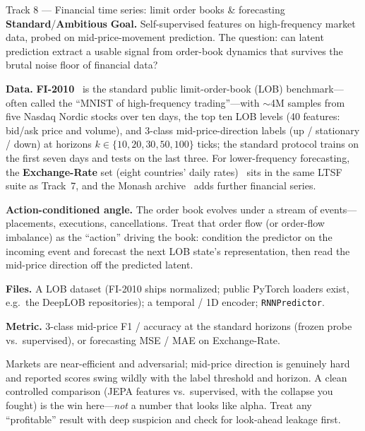 \documentclass{article}
\newcommand{\code}[1]{\texttt{\small #1}}
\newcommand{\diffmed}{\colorbox{ebamber!18}{\textcolor{ebamber}{\small\bfseries Standard}}}
\newcommand{\diffhard}{\colorbox{ebred!15}{\textcolor{ebred}{\small\bfseries Ambitious}}}
\begin{document}
\begin{trackbox}{Track 8 --- Financial time series: limit order books \& forecasting \hfill \diffmed{}/\diffhard{}}
\textbf{Goal.} Self-supervised features on high-frequency market data, probed on
mid-price-movement prediction. The question: can latent prediction extract a usable
signal from order-book dynamics that survives the brutal noise floor of financial
data?

\smallskip
\textbf{Data.} \textbf{FI-2010}~\citep{FI2010} is the standard public limit-order-book
(LOB) benchmark---often called the ``MNIST of high-frequency trading''---with
$\sim$4M samples from five Nasdaq Nordic stocks over ten days, the top ten LOB
levels (40 features: bid/ask price and volume), and 3-class mid-price-direction
labels (up / stationary / down) at horizons $k \in \{10, 20, 30, 50, 100\}$ ticks;
the standard protocol trains on the first seven days and tests on the last three.
For lower-frequency forecasting, the \textbf{Exchange-Rate} set (eight countries'
daily rates)~\citep{LSTNet} sits in the same LTSF suite as Track~7, and the Monash
archive~\citep{MonashTSF} adds further financial series.

\smallskip
\textbf{Action-conditioned angle.} The order book evolves under a stream of
events---placements, executions, cancellations. Treat that order flow (or
order-flow imbalance) as the ``action'' driving the book: condition the predictor
on the incoming event and forecast the next LOB state's representation, then read
the mid-price direction off the predicted latent.

\smallskip
\textbf{Files.} A LOB dataset (FI-2010 ships normalized; public PyTorch loaders
exist, e.g.\ the DeepLOB repositories); a temporal / 1D encoder; \code{RNNPredictor}.

\smallskip
\textbf{Metric.} 3-class mid-price F1 / accuracy at the standard horizons
(frozen probe vs.\ supervised), or forecasting MSE / MAE on Exchange-Rate.

\begin{gotchabox}
Markets are near-efficient and adversarial; mid-price direction is genuinely hard
and reported scores swing wildly with the label threshold and horizon. A clean
controlled comparison (JEPA features vs.\ supervised, with the collapse you fought)
is the win here---\emph{not} a number that looks like alpha. Treat any
``profitable'' result with deep suspicion and check for look-ahead leakage first.
\end{gotchabox}


\end{trackbox}
\end{document}

